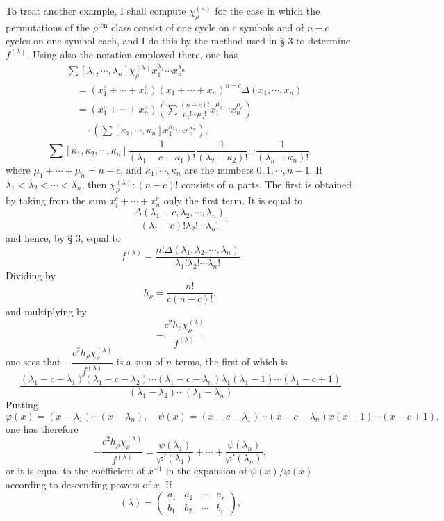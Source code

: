\documentclass[11pt]{article}
\newcommand{\ten}{\mathrm{ten}}
\begin{document}
To treat another example, I shall compute $\chi_\rho^{(\kappa)}$ for the case in which the permutations of the $\rho^{\ten}$ class consist of one cycle on $c$ symbols and of $n-c$ cycles on one symbol each, and I do this by the method used in § 3 to determine $f^{(\lambda)}$. Using also the notation employed there, one has
\[
\begin{aligned}
 &\sum[\lambda_1,
\cdots,
\lambda_n]\chi_\rho^{(\lambda)}x_1^{\lambda_1}\cdots x_n^{\lambda_n} \\
 &\quad=(x_1^c+
\cdots+x_n^c)(x_1+
\cdots+x_n)^{n-c}\Delta(x_1,
\cdots,x_n)\\
 &\quad=(x_1^c+
\cdots+x_n^c)
 \left(\sum\frac{(n-c)!}{\mu_1!\cdots\mu_n!}x_1^{\mu_1}\cdots x_n^{\mu_n}\right)\\
 &\qquad\cdot
 \left(\sum[\kappa_1,
\cdots,
\kappa_n]x_1^{\kappa_1}\cdots x_n^{\kappa_n}\right),
\end{aligned}
\]
\[
 \sum[\kappa_1,
\kappa_2,
\cdots,
\kappa_n]\frac1{(\lambda_1-c-
\kappa_1)!}\frac1{(\lambda_2-
\kappa_2)!}\cdots\frac1{(\lambda_n-
\kappa_n)!},
\]
where $\mu_1+\cdots+
\mu_n=n-c$, and $\kappa_1,
\cdots,
\kappa_n$ are the numbers $0,1,
\cdots,n-1$. If $\lambda_1<\lambda_2<\cdots<\lambda_n$, then $\chi_\rho^{(\lambda)}:(n-c)!$ consists of $n$ parts. The first is obtained by taking from the sum $x_1^c+
\cdots+x_n^c$ only the first term. It is equal to
\[
 \frac{\Delta(\lambda_1-c,
\lambda_2,
\cdots,
\lambda_n)}{(\lambda_1-c)!\lambda_2!\cdots\lambda_n!}.
\]
and hence, by § 3, equal to
\[
 f^{(\lambda)}=\frac{n!\Delta(\lambda_1,
\lambda_2,
\cdots,
\lambda_n)}{\lambda_1!\lambda_2!\cdots\lambda_n!}
\]
Dividing by
\[
 h_\rho=\frac{n!}{c(n-c)!},
\]
and multiplying by
\[
 -\frac{c^2h_\rho\chi_\rho^{(\lambda)}}{f^{(\lambda)}}
\]
one sees that $-\dfrac{c^2h_\rho\chi_\rho^{(\lambda)}}{f^{(\lambda)}}$ is a sum of $n$ terms, the first of which is
\[
 \frac{(\lambda_1-c-
\lambda_1)(\lambda_1-c-
\lambda_2)\cdots(\lambda_1-c-
\lambda_n)\lambda_1(\lambda_1-1)\cdots(\lambda_1-c+1)}{(\lambda_1-
\lambda_2)\cdots(\lambda_1-
\lambda_n)}
\]
Putting
\[
 \varphi(x)=(x-
\lambda_1)\cdots(x-
\lambda_n),
\quad
 \psi(x)=(x-c-
\lambda_1)\cdots(x-c-
\lambda_n)x(x-1)\cdots(x-c+1),
\]
one has therefore
\[
 -\frac{c^2h_\rho\chi_\rho^{(\lambda)}}{f^{(\lambda)}}=
 \frac{\psi(\lambda_1)}{\varphi'(\lambda_1)}+
\cdots+
\frac{\psi(\lambda_n)}{\varphi'(\lambda_n)},
\]
or it is equal to the coefficient of $x^{-1}$ in the expansion of $\psi(x)/\varphi(x)$ according to descending powers of $x$. If
\[
 (\lambda)=\left(\begin{matrix}a_1&a_2&\cdots&a_r\\ b_1&b_2&\cdots&b_r\end{matrix}\right),
\]
\end{document}
